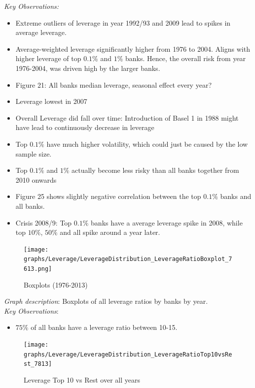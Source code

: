 \documentclass[12pt, a4paper]{article} %
\begin{document}
\noindent \textit{Key Observations:}
\begin{itemize}
\item Extreme outliers of leverage in year 1992/93 and 2009 lead to spikes in average leverage.
\item Average-weighted leverage significantly higher from 1976 to 2004. Aligns with higher leverage of top $0.1\%$ and $1\%$ banks. Hence, the overall risk from year 1976-2004, was driven high by the larger banks. 
\item Figure 21: All banks median leverage, seasonal effect every year?
\item Leverage lowest in 2007
\item Overall Leverage did fall over time: Introduction of Basel 1 in 1988 might have lead to continuously decrease in leverage
\item Top $0.1\%$ have much higher volatility, which could just be caused by the low sample size.
\item Top $0.1\%$ and $1\%$ actually become less risky than all banks together from 2010 onwards
\item Figure 25 shows slightly negative correlation between the top $0.1\%$ banks and all banks. 
\item Crisis 2008/9: Top $0.1\%$ banks have a average leverage spike in 2008, while top $10\%$, $50\%$ and all  spike around a year later.  
\end{itemize}

\newpage

\begin{figure}[hbtp]
\centering
\caption{Boxplots (1976-2013)}
\texttt{[image: graphs/Leverage/LeverageDistribution\_LeverageRatioBoxplot\_7613.png]}
\end{figure}

\noindent \textit{Graph description}: Boxplots of all leverage ratios by banks by year. 
\\

\noindent \textit{Key Observations}:
\begin{itemize}
\item $75\%$ of all banks have a leverage ratio between 10-15.
\end{itemize}



\iffalse
\begin{figure}[hbtp]
\centering
\caption{Leverage Top 10 vs Rest over all years}
\texttt{[image: graphs/Leverage/LeverageDistribution\_LeverageRatioTop10vsRest\_7813]}
\end{figure}
\end{document}
